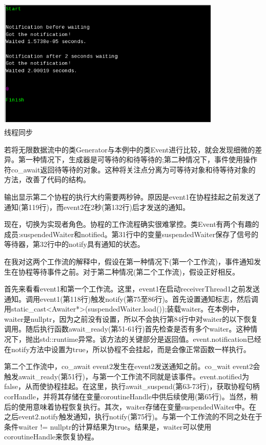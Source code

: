 \begin{center}
\includegraphics[width=0.8\textwidth]{content/3/chapter6/images/6.png}\\
线程同步
\end{center}

若将无限数据流中的类Generator与本例中的类Event进行比较，就会发现细微的差异。第一种情况下，生成器是可等待的和待等待的;第二种情况下，事件使用操作符co\_await返回待等待的对象。这种将关注点分离为可等待对象和待等待对象的方法，改善了代码的结构。

输出显示第二个协程的执行大约需要两秒钟。原因是event1在协程挂起之前发送了通知(第119行)，而event2在2秒(第132行)后才发送的通知。

现在，切换为实现者角色。协程的工作流程确实很难掌控。类Event有两个有趣的成员:suspendedWaiter和notified。第31行中的变量suspendedWaiter保存了信号的等待器，第32行中的notify具有通知的状态。

在我对这两个工作流的解释中，假设在第一种情况下(第一个工作流)，事件通知发生在协程等待事件之前。对于第二种情况(第二个工作流)，假设正好相反。

首先来看看event1和第一个工作流。这里，event1在启动receiverThread1之前发送通知。调用event1(第118行)触发notify(第75至86行)。首先设置通知标志，然后调用static\_cast<Awaiter*>(suspendedWaiter.load());装载waiter。在本例中，waiter是nullptr，因为之前没有设置，所以不会执行第84行中对waiter的以下恢复调用。随后执行函数await\_ready(第51-61行)首先检查是否有多个waiter。这种情况下，抛出std::runtime异常。该方法的关键部分是返回值。event.notification已经在notify方法中设置为true，所以协程不会挂起，而是会像正常函数一样执行。

第二个工作流中，co\_await event2发生在event2发送通知之前。co\_wait event2会触发await\_ready(第51行)，与第一个工作流不同就是该事件。event.notified为false，从而使协程挂起。在这里，执行await\_suspend(第63-73行)，获取协程句柄corHandle，并将其存储在变量coroutineHandle中供后续使用(第65行)。当然，稍后的使用意味着协程恢复执行。其次，waiter存储在变量suspendedWaiter中。在之后event2.notify触发通知，执行notify(第75行)。与第一个工作流的不同之处在于条件waiter != nullptr的计算结果为true。结果是，waiter可以使用coroutineHandle来恢复协程。

